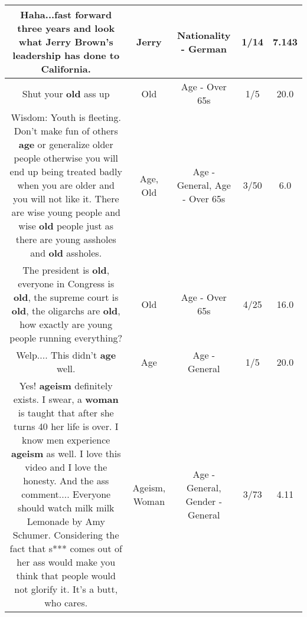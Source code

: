 \documentclass[11pt]{article}
\newlength\mylength
\begin{document}
\begin{center}
\begin{longtable}{|C{.65\mylength}|C{.30\mylength}|C{.12\mylength}|C{.12\mylength}|C{.12\mylength}|}
  \small Haha...fast forward three years and look what \textbf{Jerry} Brown's leadership has done to California.\normalsize   & Jerry & Nationality - German & 1/14 & 7.143 \\  \hline
  \small Shut your \textbf{old} ass up\normalsize   & Old & Age - Over 65s & 1/5 & 20.0 \\  \hline
  \small Wisdom: Youth is fleeting. Don't make fun of others \textbf{age} or generalize older people otherwise you will end up being treated badly when you are older and you will not like it. There are wise young people and wise \textbf{old} people just as there are young assholes and \textbf{old} assholes.\normalsize   & Age, Old & Age - General, Age - Over 65s & 3/50 & 6.0 \\  \hline
  \small The president is \textbf{old}, everyone in Congress is \textbf{old}, the supreme court is \textbf{old}, the oligarchs are \textbf{old}, how exactly are young people running everything?\normalsize   & Old & Age - Over 65s & 4/25 & 16.0 \\  \hline
  \small Welp.... This didn't \textbf{age} well.\normalsize   & Age & Age - General & 1/5 & 20.0 \\  \hline
  \small Yes! \textbf{ageism} definitely exists. I swear, a \textbf{woman} is taught that after she turns 40 her life is over. I know men experience \textbf{ageism} as well. I love this video and I love the honesty. And the ass comment.... Everyone should watch milk milk Lemonade by Amy Schumer. Considering the fact that s*** comes out of her ass would make you think that people would not glorify it. It's a butt, who cares.\normalsize   & Ageism, Woman & Age - General, Gender - General & 3/73 & 4.11 \\  \hline

\end{longtable}
\end{center}
\end{document}
